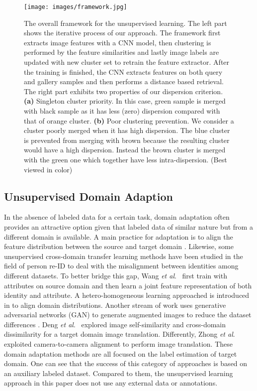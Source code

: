 \documentclass[journal]{IEEEtran}
\newcommand{\etal}{\textit{et al}.}
\begin{document}
\begin{figure*}[htb]
\begin{center}
    \centering
    \texttt{[image: images/framework.jpg]}
    \caption{ The overall framework for the unsupervised learning. The left part shows the iterative process of our approach. The framework first extracts image features with a CNN model, then clustering is performed by the feature similarities and lastly image labels are updated with new cluster set to retrain the feature extractor. After the training is finished, the CNN extracts features on both query and gallery samples and then performs a distance based retrieval. The right part exhibits two properties of our dispersion criterion. \textbf{(a)} Singleton cluster priority. In this case, green sample is merged with black sample as it has less (zero) dispersion compared with that of orange cluster. \textbf{(b)} Poor clustering prevention. We consider a cluster poorly merged when it has high dispersion. The blue cluster is prevented from merging with brown because the resulting cluster would have a high dispersion. Instead the brown cluster is merged with the green one which together have less intra-dispersion. (Best viewed in color)}
    \label{fig:framwork}
    \end{center}
\end{figure*} \subsection{Unsupervised Domain Adaption}
In the absence of labeled data for a certain task, domain adaptation often provides an attractive option given that labeled data of similar nature but from a different domain is available. A main practice for adaptation is to align the feature distribution between the source and target domain \cite{tzeng2015simultaneous,long2015learning,sun2016deep,ganin2015unsupervised,sun2016return}. Likewise, some unsupervised cross-domain transfer learning methods \cite{peng2016unsupervised,zhong2019camstyle} have been studied in the field of person re-ID to deal with the misalignment between identities among different datasets. To better bridge this gap, Wang \etal\ \cite{wang2018transferable} first train with attributes on source domain and then learn a joint feature representation of both identity and attribute. A hetero-homogeneous learning approached is introduced in \cite{zhong2018generalizing} to align domain distributions. Another stream of work uses generative adversarial networks (GAN) to generate augmented images to reduce the dataset differences \cite{zhong2019camstyle,deng2018image}. Deng \etal\ \cite{deng2018image} explored image self-similarity and cross-domain dissimilarity for a target domain image translation. Differently, Zhong \etal\ \cite{zhong2019camstyle} exploited camera-to-camera alignment to perform image translation. These domain adaptation methods are all focused on the label estimation of target domain. One can see that the success of this category of approaches is based on an auxiliary labeled dataset. Compared to them, the unsupervised learning approach in this paper does not use any external data or annotations.
\end{document}
